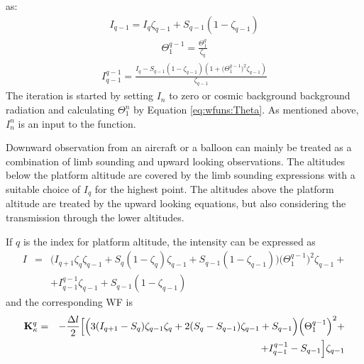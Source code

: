  as:
 \begin{eqnarray}
   I_{q-1} = I_q\zeta_{q-1} + S_{q-1}(1-\zeta_{q-1}) \nonumber
 \end{eqnarray}
 \begin{eqnarray}
   \Theta_{1}^{q-1} =  \frac{\Theta_{1}^{q}}{\zeta_q} \nonumber
 \end{eqnarray}
 \begin{eqnarray}
   I_{q-1}^{q-1} = \frac{I_q - S_{q-1}(1-\zeta_{q-1})
       (1+\big(\Theta^{q-1}_{1}\big)^2\zeta_{q-1})}{\zeta_{q-1}} \nonumber
 \end{eqnarray}
 The iteration is started by setting $I_n$ to zero or cosmic background
 background radiation and calculating $\Theta^n_1$ by Equation 
 \ref{eq:wfuns:Theta}. As mentioned above, $I_n^n$ is an input to the 
 function.
 
 

  \label{sec:wfuns:down}
  Downward observation from an aircraft or a balloon can mainly be
  treated as a combination of limb sounding and upward looking
  observations.  The altitudes below the platform altitude are covered
  by the limb sounding expressions with a suitable choice of $I_q$ for
  the highest point. The altitudes above the platform altitude are
  treated by the upward looking equations, but also considering the
  transmission through the lower altitudes. 
  
  If $q$ is the index for platform altitude, the intensity can be
  expressed as
  \begin{eqnarray}
   I &=& \Big(I_{q+1}\zeta_q\zeta_{q-1} +S_q(1-\zeta_q)\zeta_{q-1} + 
           S_{q-1}(1-\zeta_{q-1})\Big)\Big(\Theta^{q-1}_{1}\Big)^2
           \zeta_{q-1} + \nonumber \\
      & & + I_{q-1}^{q-1}\zeta_{q-1} + S_{q-1}(1-\zeta_{q-1})
    \label{eq:wfuns:idown}
  \end{eqnarray}
  and the corresponding WF is
  \begin{eqnarray}
   \mathbf{K}_{\kappa}^q& = & -\frac{\Delta l}{2}\Big[\Big(3(I_{q+1}-S_q)
           \zeta_{q-1}\zeta_q+ 2(S_q-S_{q-1})\zeta_{q-1} + S_{q-1} \Big)
           \Big(\Theta^{q-1}_{1}\Big)^2 + \nonumber \\
      & &  + I_{q-1}^{q-1}-S_{q-1}\Big]\zeta_{q-1}
  \end{eqnarray}



 \label{sec:wfuns:bases}

